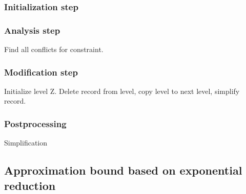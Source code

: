 \subsubsection{Initialization step}

\subsubsection{Analysis step}

Find all conflicts for constraint.

\subsubsection{Modification step}

Initialize level Z. Delete record from level, copy level to next level, simplify record.

\subsubsection{Postprocessing}

Simplification


\subsection{Approximation bound based on exponential reduction}
